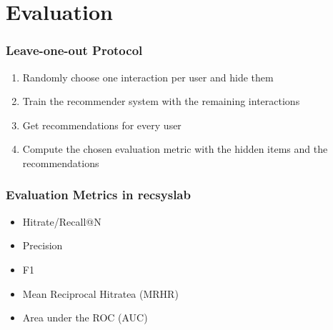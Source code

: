 \documentclass[mathserif,svgnames]{beamer}
\newcommand\marktopleft[1]{%
    \tikz[overlay,remember picture] 
    \node (marker-#1-a) at (0,1.5ex) {};%
}
\newcommand\markbottomright[2][red]{%
    \tikz[overlay,remember picture] 
    \node (marker-#2-b) at (0,0) {};%
    \tikz[overlay,remember picture,thick,inner sep=3pt,fill=red]
    \node[draw,rectangle,fill=#1,nearly transparent,fit=(marker-#2-a.center) (marker-#2-b.center)] {};%
}
\begin{document}
%

\section{Evaluation}
\begin{frame}
    \frametitle{Leave-one-out Protocol}
    \begin{enumerate}
        \item Randomly choose one interaction per user and hide them
        \item Train the recommender system with the remaining interactions
        \item Get recommendations for every user
        \item Compute the chosen evaluation metric with the hidden items and the recommendations
    \end{enumerate}

\end{frame}
\begin{frame}
    \frametitle{Evaluation Metrics in recsyslab}
    \begin{itemize}
        \item Hitrate/Recall@N
        \item Precision
        \item F1
        \item Mean Reciprocal Hitratea (MRHR)
        \item Area under the ROC (AUC)
    \end{itemize}
\end{frame}
\end{document}
